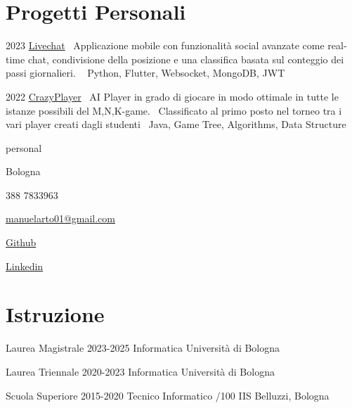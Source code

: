 \documentclass{tccv}
\begin{document}
\section{Progetti Personali}

\begin{yearlist}

\item{2023}
     {\href{https://github.com/manuelarto/livechat}{Livechat}}
     {\textbullet~Applicazione mobile con funzionalità social avanzate come real-time chat, condivisione della posizione e una classifica basata sul conteggio dei passi giornalieri. \newline
    \textbullet~ Python, Flutter, Websocket, MongoDB, JWT}
\item{2022}
     {\href{https://github.com/manuelarto/crazyplayer}{CrazyPlayer}}
     {\textbullet~AI Player in grado di giocare in modo ottimale in tutte le istanze possibili del M,N,K-game. \newline
     \textbullet~Classificato al primo posto nel torneo tra i vari player creati dagli studenti  \newline
    \textbullet~Java, Game Tree, Algorithms, Data Structure}
\end{yearlist}


\newpage


\begin{keyvaluelist}{personal}
    \item[\faHome] Bologna
    \item[\faPhone] 388 7833963
    \item[\faEnvelope] \href{mailto:my@email.address}{manuelarto01@gmail.com}
    \item[\faGithub] \href{https://github.com/manuelarto}{Github}
    \item[\faLinkedin] \href{https://www.linkedin.com/in/manuel-arto-696012203/}{Linkedin}
\end{keyvaluelist}


\section{Istruzione}

\begin{yearlist}

\item[Laurea Magistrale]{2023-2025}
     {Informatica}
     {Università di Bologna}

\item[Laurea Triennale]{2020-2023}
    {Informatica}
    {Università di Bologna}

\item[Scuola Superiore]{2015-2020}
    {Tecnico Informatico /100}
    {IIS Belluzzi, Bologna}

\end{yearlist}
\end{document}
